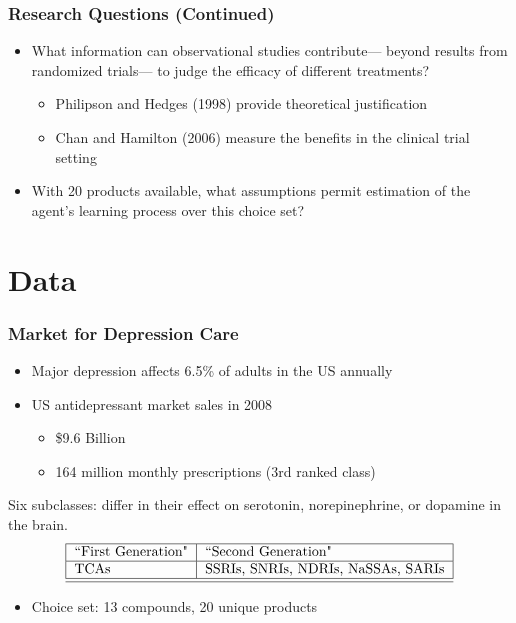 \documentclass[aspectratio=169,11pt]{beamer}
\begin{document}
\begin{frame}
\frametitle{Research Questions (Continued)}

\begin{itemize}
\item What information can observational studies contribute--- beyond
results from randomized trials--- to judge the efficacy of different
treatments?

\begin{itemize}
\item Philipson and Hedges (1998) provide theoretical justification

\item Chan and Hamilton (2006) measure the benefits in the clinical trial
setting
\end{itemize}

\item With 20 products available, what assumptions permit estimation of the
agent's learning process over this choice set?
\end{itemize}
\end{frame}


\section{Data}


\begin{frame}
\frametitle{Market for Depression Care}

\begin{itemize}
\item Major depression affects 6.5\% of adults in the US annually

\item US antidepressant market sales in 2008

\begin{itemize}
\item \$9.6 Billion

\item 164 million monthly prescriptions (3rd ranked class)
\end{itemize}
\end{itemize}

Six subclasses: differ in their effect on serotonin, norepinephrine, or
dopamine in the brain.%
\[
\begin{tabular}{|l|l|}
\hline
$\text{``First Generation"}$ & $\text{``Second Generation"}$ \\ \hline
$\text{TCAs}$ & $\text{SSRIs, SNRIs, NDRIs, NaSSAs, SARIs}$ \\ \hline\hline
\end{tabular}%
\]

\begin{itemize}
\item Choice set: 13 compounds, 20 unique products
\end{itemize}
\end{frame}
\end{document}
